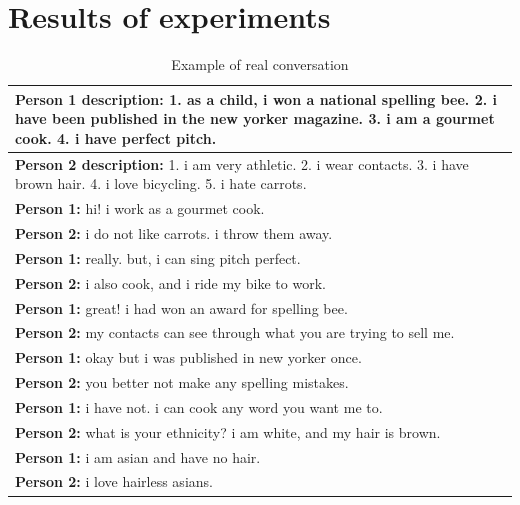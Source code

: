 \chapter{Results of experiments}

\begin{table}[ht]
\centering
 \begin{tabular}{|p{14cm}|} 
 \hline\hline
 \textbf{Person 1 description:} 1. as a child, i won a national spelling bee. 2. i have been published in the new yorker magazine. 3. i am a gourmet cook. 4. i have perfect pitch. \\
 \hline
 \textbf{Person 2 description:} 1. i am very athletic.  2. i wear contacts. 3. i have brown hair. 4. i love bicycling. 5. i hate carrots. \\
 \hline\hline
 \textbf{Person 1:} hi! i work as a gourmet cook. \\
 \textbf{Person 2:} i do not like carrots. i throw them away.\\ 
 \textbf{Person 1:} really. but, i can sing pitch perfect. \\
 \textbf{Person 2:} i also cook, and i ride my bike to work. \\
 \textbf{Person 1:} great! i had won an award for spelling bee. \\
 \textbf{Person 2:} my contacts can see through what you are trying to sell me. \\
 \textbf{Person 1:} okay but i was published in new yorker once. \\
 \textbf{Person 2:} you better not make any spelling mistakes. \\
 \textbf{Person 1:} i have not. i can cook any word you want me to. \\
 \textbf{Person 2:} what is your ethnicity? i am white, and my hair is brown. \\
 \textbf{Person 1:} i am asian and have no hair. \\
 \textbf{Person 2:} i love hairless asians. \\
 \hline\hline
 \end{tabular}
 \caption{Example of real conversation}
\label{tab:real_conversation_ap}
\end{table}

